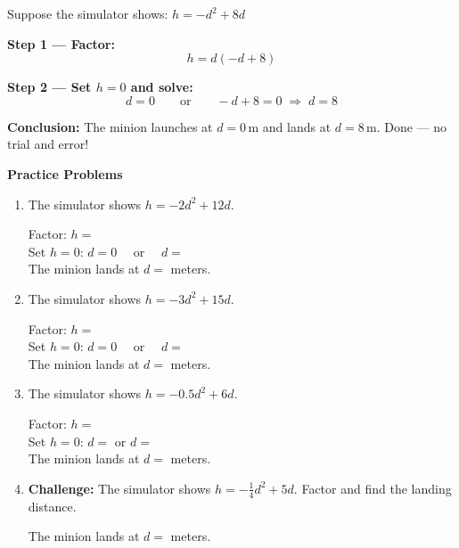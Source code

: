 \documentclass[12pt]{article}
\newcommand{\blank}[1][4cm]{\underline{\hspace{#1}}}
\begin{document}
Suppose the simulator shows: \quad $h = -d^2 + 8d$

\textbf{Step 1 --- Factor:}
\[
  h = d(-d + 8)
\]

\textbf{Step 2 --- Set $h = 0$ and solve:}
\[
  d = 0 \qquad \text{or} \qquad -d + 8 = 0 \;\Rightarrow\; d = 8
\]

\textbf{Conclusion:} The minion launches at $d = 0$\,m and lands at
$\boxed{d = 8}$\,m.  Done --- no trial and error!

\bigskip
\textbf{Practice Problems}

\begin{enumerate}[leftmargin=*, label=\textbf{\arabic*.}]

\item The simulator shows $h = -2d^2 + 12d$.

  \begin{workbox}
  Factor: \quad $h = $ \blank[7cm] \\[10pt]
  Set $h = 0$: \quad $d = 0 \quad$ or $\quad d = $ \blank[2.5cm]\\[10pt]
  The minion lands at $d = $ \blank[2cm] meters.
  \end{workbox}

\vspace{8pt}
\item The simulator shows $h = -3d^2 + 15d$.

  \begin{workbox}
  Factor: \quad $h = $ \blank[7cm] \\[10pt]
  Set $h = 0$: \quad $d = 0 \quad$ or $\quad d = $ \blank[2.5cm]\\[10pt]
  The minion lands at $d = $ \blank[2cm] meters.
  \end{workbox}

\vspace{8pt}
\item The simulator shows $h = -0.5d^2 + 6d$.

  \begin{workbox}
  Factor: \quad $h = $ \blank[7cm] \\[10pt]
  Set $h = 0$: \quad $d = $ \blank[2cm] or $d = $ \blank[2cm]\\[10pt]
  The minion lands at $d = $ \blank[2cm] meters.
  \end{workbox}

\vspace{8pt}
\item \textbf{Challenge:} The simulator shows $h = -\tfrac{1}{4}d^2 + 5d$.
      Factor and find the landing distance.

  \begin{workbox}
  \vspace{2.5cm}
  The minion lands at $d = $ \blank[2cm] meters.
  \end{workbox}

\end{enumerate}
\end{document}
